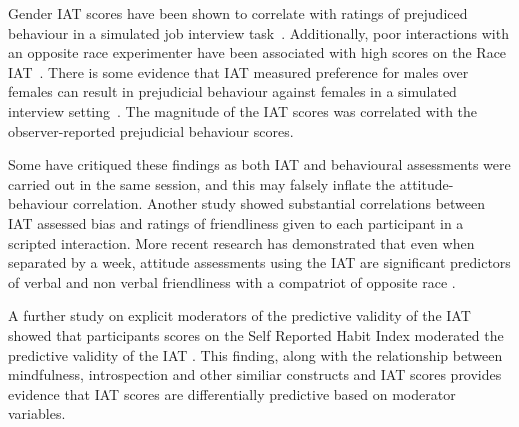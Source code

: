 

Gender IAT scores have been shown to correlate with ratings of prejudiced behaviour in a simulated job interview task~\cite{Rudman1999a}. Additionally, poor interactions with an opposite race experimenter have been associated with high scores on the Race IAT~\cite{McConnell2001}. 
There is some evidence that IAT measured preference for males over females  can result in prejudicial behaviour against females in a simulated interview setting~\cite{Greenwald2000,Heider2007}. The magnitude of the IAT scores was correlated with the observer-reported prejudicial behaviour scores. 

Some have critiqued these findings as both IAT and behavioural assessments were carried out in the same session, and this may falsely inflate the attitude-behaviour correlation. Another study \cite{McConnell2001} showed substantial correlations between IAT assessed bias and ratings of friendliness given to each participant in a scripted interaction. More recent research has demonstrated that even when separated by a week, attitude assessments using the IAT are significant predictors of verbal and non verbal friendliness with a compatriot of opposite race \cite{Heider2007}. 



A further study on explicit moderators of the predictive validity of the IAT showed that participants scores on the Self Reported Habit Index moderated the predictive validity of the IAT \cite{Conner2007}. This finding, along with the relationship between mindfulness, introspection and other similiar constructs and IAT scores provides evidence that IAT scores are differentially predictive based on moderator variables. 



